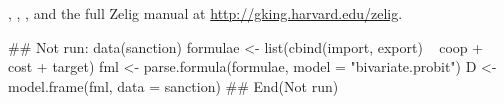 \begin{SeeAlso}\relax
{}, , 
, and the full Zelig manual at
\url{http://gking.harvard.edu/zelig}.
\end{SeeAlso}
\begin{Examples}
\begin{ExampleCode}
## Not run: 
data(sanction)
formulae <- list(cbind(import, export) ~ coop + cost + target)
fml <- parse.formula(formulae, model = "bivariate.probit")
D <- model.frame(fml, data = sanction)
## End(Not run)\end{ExampleCode}
\end{Examples}


